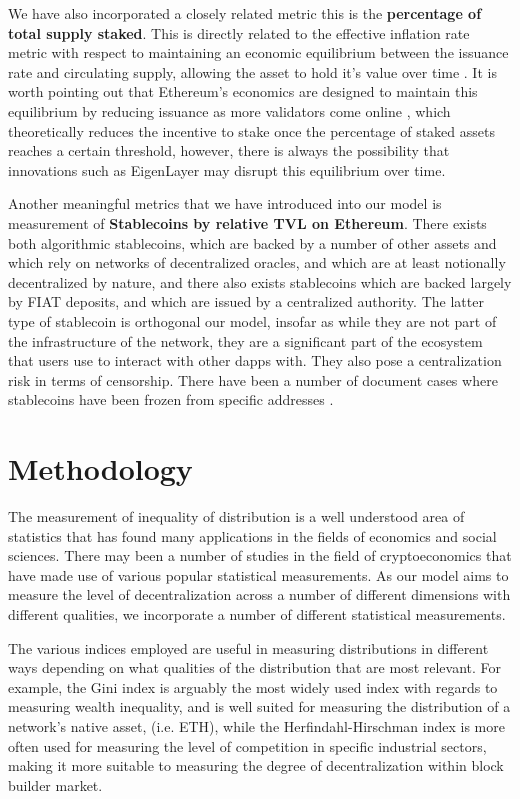 \documentclass[conference]{IEEEtran}
\begin{document}
We have also incorporated a closely related metric this is the \textbf{percentage of total supply staked}.  This is directly related to the effective inflation rate metric with respect to maintaining an economic equilibrium between the issuance rate and circulating supply, allowing the asset to hold it's value over time \cite{john2021equilibrium}.  It is worth pointing out that Ethereum's economics are designed to maintain this equilibrium by reducing issuance as more validators come online \cite{edgington2023}, which theoretically reduces the incentive to stake once the percentage of staked assets reaches a certain threshold, however, there is always the possibility that innovations such as EigenLayer may disrupt this equilibrium over time.

Another meaningful metrics that we have introduced into our model is measurement of \textbf{Stablecoins by relative TVL on Ethereum}.  There exists both algorithmic stablecoins, which are backed by a number of other assets and which rely on networks of decentralized oracles, and which are at least notionally decentralized by nature, and there also exists stablecoins which are backed largely by FIAT deposits, and which are issued by a centralized authority.  The latter type of stablecoin is orthogonal our model, insofar as while they are not part of the infrastructure of the network, they are a significant part of the ecosystem that users use to interact with other dapps with.  They also pose a centralization risk in terms of censorship.  There have been a number of document cases where stablecoins have been frozen from specific addresses \cite{wall2021}.

\section*{Methodology}

The measurement of inequality of distribution is a well understood area of statistics that has found many applications in the fields of economics and social sciences. There may been a number of studies in the field of cryptoeconomics that have made use of various popular statistical measurements.  As our model aims to measure the level of decentralization across a number of different dimensions with different qualities, we incorporate a number of different statistical measurements.

The various indices employed are useful in measuring distributions in different ways depending on what qualities of the distribution that are most relevant.  For example, the Gini index is arguably the most widely used index with regards to measuring wealth inequality, and is well suited for measuring the distribution of a network's native asset, (i.e. ETH), while the Herfindahl-Hirschman index is more often used for measuring the level of competition in specific industrial sectors, making it more suitable to measuring the degree of decentralization within block builder market.
\end{document}
